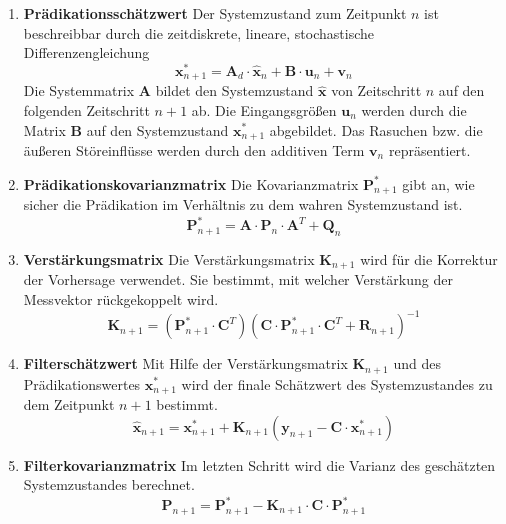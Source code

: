 \begin{enumerate}
	\item \textbf{Prädikationsschätzwert}
	\newline
	Der Systemzustand zum Zeitpunkt $n$ ist beschreibbar durch die zeitdiskrete, lineare, stochastische Differenzengleichung
	\begin{equation}
	\boldsymbol{x}^*_{n+1} = \boldsymbol{A}_d \cdot \boldsymbol{\hat{x}}_n + \boldsymbol{B} \cdot \boldsymbol{u}_n + \boldsymbol{v}_n
	\end{equation}
	Die Systemmatrix $\boldsymbol{A}$ bildet den Systemzustand $\boldsymbol{\hat{x}}$ von Zeitschritt $n$ auf den folgenden Zeitschritt $n+1$ ab. Die Eingangsgrößen $\boldsymbol{u}_n$ werden durch die Matrix $\boldsymbol{B}$ auf den Systemzustand $\boldsymbol{x}^*_{n+1}$ abgebildet. Das Rasuchen bzw. die äußeren Störeinflüsse werden durch den additiven Term $\boldsymbol{v}_n$ repräsentiert.
	\item \textbf{Prädikationskovarianzmatrix}
	\newline
	Die Kovarianzmatrix $\boldsymbol{P}^*_{n+1}$ gibt an, wie sicher die Prädikation im Verhältnis zu dem wahren Systemzustand ist.
	\begin{equation}
	\boldsymbol{P}^*_{n+1} = \boldsymbol{A} \cdot \boldsymbol{\hat{P}}_n \cdot \boldsymbol{A}^T + \boldsymbol{Q}_n
	\end{equation}
	\item \textbf{Verstärkungsmatrix} \newline
	Die Verstärkungsmatrix $\boldsymbol{K}_{n+1}$ wird für die Korrektur der Vorhersage verwendet. Sie bestimmt, mit welcher Verstärkung der Messvektor rückgekoppelt wird.
	\begin{equation}
	\boldsymbol{K}_{n+1} = (\boldsymbol{P}^*_{n+1} \cdot \boldsymbol{C}^T)(\boldsymbol{C} \cdot \boldsymbol{P}^*_{n+1} \cdot \boldsymbol{C}^T + \boldsymbol{R}_{n+1})^{-1}
	\end{equation}
	\item \textbf{Filterschätzwert}
	Mit Hilfe der Verstärkungsmatrix $\boldsymbol{K}_{n+1}$ und des Prädikationswertes $\boldsymbol{x}^*_{n+1}$ wird der finale Schätzwert des Systemzustandes zu dem Zeitpunkt $n+1$ bestimmt.
	\begin{equation}
	\boldsymbol{\hat{x}}_{n+1} = \boldsymbol{x}^*_{n+1} + \boldsymbol{K}_{n+1}(\boldsymbol{y}_{n+1} - \boldsymbol{C} \cdot \boldsymbol{x}^*_{n+1})
	\end{equation}
	\item \textbf{Filterkovarianzmatrix}
	Im letzten Schritt wird die Varianz des geschätzten Systemzustandes berechnet.
	\begin{equation}
	\boldsymbol{\hat{P}}_{n+1} = \boldsymbol{P}^*_{n+1} - \boldsymbol{K}_{n+1} \cdot \boldsymbol{C} \cdot \boldsymbol{P}^*_{n+1}
	\end{equation}
\end{enumerate}

